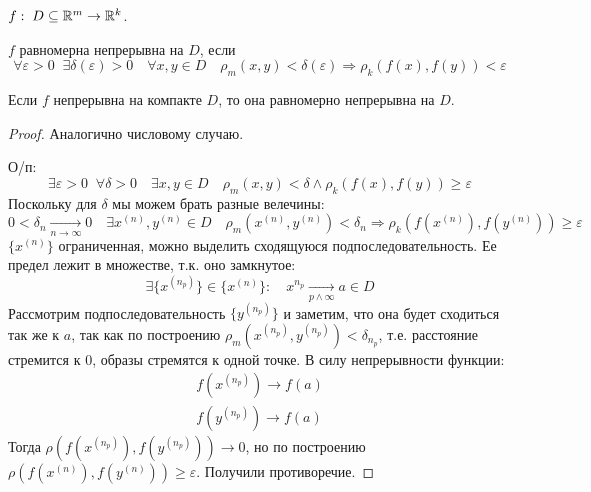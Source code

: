 \begin{definition}
    $f:\; D \subseteq \mathbb{R}^m \rightarrow \mathbb{R}^k$. 

    $f$ равномерна непрерывна на $D$, если
    \[
        \forall \varepsilon > 0\;\; \exists \delta(\varepsilon) > 0 \quad
        \forall x, y \in D \quad \rho_m(x, y) < \delta(\varepsilon) \Rightarrow \rho_k(f(x), f(y)) < \varepsilon
    \]
\end{definition}

\begin{theorem}
    Если $f$ непрерывна на компакте $D$, то она равномерно непрерывна на $D$.
\end{theorem}

\begin{proof}
    Аналогично числовому случаю.

    О/п:
    \[
        \exists \varepsilon > 0\;\; \forall \delta > 0 \quad
        \exists x, y \in D \quad \rho_m(x, y) < \delta \wedge \rho_k(f(x), f(y)) \geqslant \varepsilon
    \]
    Поскольку для $\delta$ мы можем брать разные велечины:
    \[
        0 < \delta_n  \xrightarrow[n \rightarrow \infty]{} 0 \quad
        \exists x^{(n)}, y^{(n)} \in D \quad \rho_m(x^{(n)}, y^{(n)}) < \delta_n \Rightarrow \rho_k(f(x^{(n)}), f(y^{(n)})) \geqslant \varepsilon
    \]
    $\{x^{(n)}\}$ ограниченная, можно выделить сходящуюся подпоследовательность. Ее предел лежит в множестве, т.к. оно замкнутое:
    \[
        \exists \{x^{(n_p)}\} \in \{x^{(n)}\}: \quad x^{n_p} \xrightarrow[p \wedge \infty]{} a \in D
    \]
    Рассмотрим подпоследовательность $\{y^{(n_p)}\}$ 
    и заметим, что она будет сходиться так же к $a$, так как по построению
    $\rho_m(x^{(n_p)}, y^{(n_p)}) < \delta_{n_p}$, т.е. расстояние стремится к 0, образы стремятся к одной точке.
    В силу непрерывности функции:
    \begin{gather*}
        f(x^{(n_p)}) \rightarrow f(a)\\
        f(y^{(n_p)}) \rightarrow f(a)
    \end{gather*}    
    Тогда $\rho(f(x^{(n_p)}), f(y^{(n_p)})) \rightarrow 0$, но по построению $\rho(f(x^{(n)}), f(y^{(n)})) \geqslant \varepsilon$. Получили противоречие.
\end{proof}
